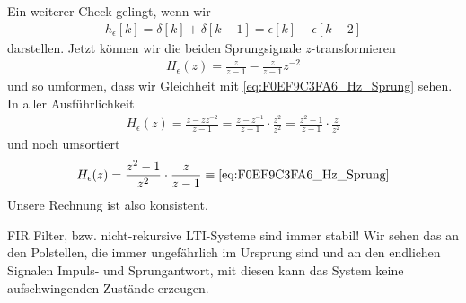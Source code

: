 \begin{Loesung}
Ein weiterer Check gelingt, wenn wir
\begin{align}
h_\epsilon[k] = \delta[k] + \delta[k-1] = \epsilon[k] - \epsilon[k-2]
\end{align}
darstellen.
%
Jetzt können wir die beiden Sprungsignale $z$-transformieren
\begin{align}
H_\epsilon(z) = \frac{z}{z-1} - \frac{z}{z-1} z^{-2}
\end{align}
und so umformen, dass wir Gleichheit mit \eqref{eq:F0EF9C3FA6_Hz_Sprung} sehen.
%
In aller Ausführlichkeit
\begin{align}
H_\epsilon(z) = \frac{z- z z^{-2}}{z-1} = \frac{z- z^{-1}}{z-1} \cdot \frac{z^2}{z^2} =
\frac{z^2- 1}{z-1} \cdot \frac{z}{z^2}
\end{align}
und noch umsortiert
\begin{align}
H_\epsilon(z) = \frac{z^2- 1}{z^2} \cdot \frac{z}{z-1} \equiv \eqref{eq:F0EF9C3FA6_Hz_Sprung}
\end{align}
%
Unsere Rechnung ist also konsistent.

FIR Filter, bzw. nicht-rekursive LTI-Systeme sind immer stabil! Wir sehen das
an den Polstellen, die immer ungefährlich im Ursprung sind und an den endlichen
Signalen Impuls- und Sprungantwort, mit diesen kann das System keine aufschwingenden
Zustände erzeugen.

\end{Loesung}

